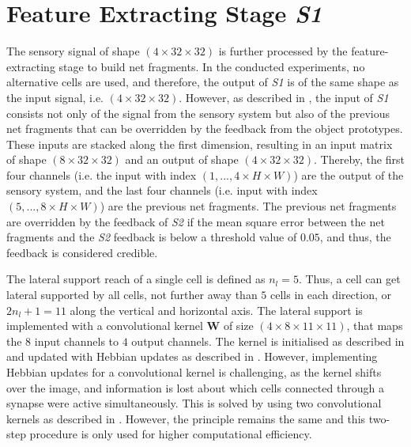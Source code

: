 \section{Feature Extracting Stage \emph{S1}}
The sensory signal of shape $(4 \times 32 \times 32)$ is further processed by the feature-extracting stage to build net fragments. In the conducted experiments, no alternative cells are used, and therefore, the output of \emph{S1} is of the same shape as the input signal, i.e. $(4 \times 32 \times 32)$.
However, as described in , the input of \emph{S1} consists not only of the signal from the sensory system but also of the previous net fragments that can be overridden by the feedback from the object prototypes.
These inputs are stacked along the first dimension, resulting in an input matrix of shape $(8 \times 32 \times 32)$ and an output of shape $(4 \times 32 \times 32)$.
Thereby, the first four channels (i.e. the input with index $(1, ..., 4 \times H \times W)$) are the output of the sensory system, and the last four channels (i.e. input with index $(5, ..., 8 \times H \times W)$) are the previous net fragments.
The previous net fragments are overridden by the feedback of \emph{S2} if the mean square error between the net fragments and the \emph{S2} feedback is below a threshold value of $0.05$, and thus, the feedback is considered credible.

The lateral support reach of a single cell is defined as $n_l=5$. Thus, a cell can get lateral supported by all cells, not further away than $5$ cells in each direction, or $2n_l+1=11$ along the vertical and horizontal axis.
The lateral support is implemented with a convolutional kernel $\boldsymbol{W}$ of size $(4 \times 8 \times 11 \times 11)$, that maps the $8$ input channels to $4$ output channels.
The kernel is initialised as described in  and updated with Hebbian updates as described in .
However, implementing Hebbian updates for a convolutional kernel is challenging, as the kernel shifts over the image, and information is lost about which cells connected through a synapse were active simultaneously. This is solved by using two convolutional kernels as described in . However, the principle remains the same and this two-step procedure is only used for higher computational efficiency.

